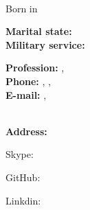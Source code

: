 \documentclass{./../lib/curriculumVitae}
\begin{document}
\iftoggle{Dev}{\par}{}
\noindent\parbox{56mm}
{\parbox{56mm}{\raggedright\Huge\bfseries\color{cyan}\fullName}\\\parbox{56mm}{\centering Born in \bornData}}\quad\parbox{38mm}
{\textbf{Marital state:} \maritalState\\\textbf{Military service:} \militaryService}\quad\parbox{90mm}
{\textbf{Profession:} \ProfessionI, \ProfessionII\\\textbf{Phone:} \mobilePhoneI, \mobilePhoneII, \phoneNumber\\\textbf{E-mail:} \emailI, \emailII}\\
\textbf{Address:} \fullAddress\\
\parbox{44mm}{Skype: \skype}\quad\parbox{70mm}{GitHub: \gitHub}\quad\parbox{70mm}{Linkdin: \linkedin}

\descriptions

\education

\workExperience

\teaching

\project

\publication

\LicensesCertifications

\honorsAwards

\training

\languageS

\craft

\voluntary
\end{document}

